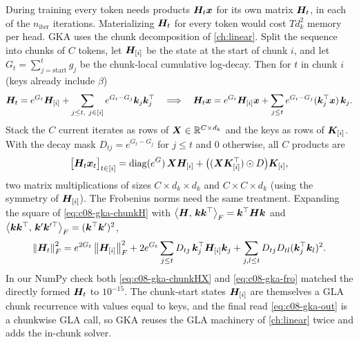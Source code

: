 During training every token needs products $\bm{H}_t\bm{x}$ for its own matrix $\bm{H}_t$, in each of the
$n_\text{iter}$ iterations. Materializing $\bm{H}_t$ for every token would cost $Td_k^2$ memory per
head. GKA uses the chunk decomposition of \cref{ch:linear}. Split the sequence into chunks of $C$
tokens, let $\bm{H}_{[i]}$ be the state at the start of chunk $i$, and let $G_t=\sum_{j=\text{start}}^{t}
g_j$ be the chunk-local cumulative log-decay. Then for $t$ in chunk $i$ (keys already include
$\beta$)
\begin{equation}\label{eq:c08-gka-chunkH}
  \mH_t = e^{G_t}\mH_{[i]}+\sum_{j\le t,\ j\in[i]}e^{G_t-G_j}\vk_j\vk_j\T
  \quad\Longrightarrow\quad
  \mH_t\vx = e^{G_t}\mH_{[i]}\vx+\sum_{j\le t}e^{G_t-G_j}(\vk_j\T\vx)\,\vk_j .
\end{equation}
Stack the $C$ current iterates as rows of $\bm{X}\in\mathbb{R}^{C\times d_k}$ and the keys as rows of
$\bm{K}_{[i]}$. With the decay mask $D_{tj}=e^{G_t-G_j}$ for $j\le t$ and $0$ otherwise, all $C$
products are
\begin{equation}\label{eq:c08-gka-chunkHX}
  \bigl[\bm{H}_t\bm{x}_t\bigr]_{t\in[i]} = \operatorname{diag}(e^{G})\,\bm{X}\bm{H}_{[i]}+\bigl((\bm{X}\bm{K}_{[i]}^{\top})\odot D\bigr)\bm{K}_{[i]} ,
\end{equation}
two matrix multiplications of sizes $C\times d_k\times d_k$ and $C\times C\times d_k$ (using the
symmetry of $\bm{H}_{[i]}$). The Frobenius norms need the same treatment. Expanding the square of
\eqref{eq:c08-gka-chunkH} with $\left\langle \bm{H},\, \bm{k}\bm{k}^{\top}\right\rangle_F=\bm{k}^{\top}\bm{H}\bm{k}$ and
$\left\langle \bm{k}\bm{k}^{\top},\, \bm{k}'\bm{k}'^{\top}\right\rangle_F=(\bm{k}^{\top}\bm{k}')^2$,
\begin{equation}\label{eq:c08-gka-fro}
  \left\lVert \bm{H}_t\right\rVert_F^2=e^{2G_t}\left\lVert \bm{H}_{[i]}\right\rVert_F^2+2e^{G_t}\sum_{j\le t}D_{tj}\,\bm{k}_j^{\top}\bm{H}_{[i]}\bm{k}_j
  +\sum_{j,l\le t}D_{tj}D_{tl}(\bm{k}_j^{\top}\bm{k}_l)^2 .
\end{equation}
In our NumPy check both \eqref{eq:c08-gka-chunkHX} and \eqref{eq:c08-gka-fro} matched the directly
formed $\bm{H}_t$ to $10^{-15}$. The chunk-start states $\bm{H}_{[i]}$ are themselves a GLA chunk
recurrence with values equal to keys, and the final read \eqref{eq:c08-gka-out} is a chunkwise GLA
call, so GKA reuses the GLA machinery of \cref{ch:linear} twice and adds the in-chunk solver.

